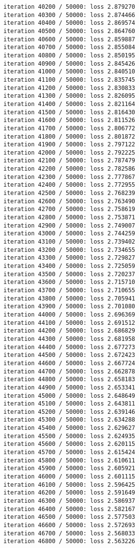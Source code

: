 \documentclass[11pt]{article}
\begin{document}
\begin{Verbatim}[commandchars=\\\{\}]
iteration 40200 / 50000: loss 2.879270
iteration 40300 / 50000: loss 2.874466
iteration 40400 / 50000: loss 2.869574
iteration 40500 / 50000: loss 2.864760
iteration 40600 / 50000: loss 2.859887
iteration 40700 / 50000: loss 2.855084
iteration 40800 / 50000: loss 2.850195
iteration 40900 / 50000: loss 2.845426
iteration 41000 / 50000: loss 2.840510
iteration 41100 / 50000: loss 2.835745
iteration 41200 / 50000: loss 2.830833
iteration 41300 / 50000: loss 2.826095
iteration 41400 / 50000: loss 2.821164
iteration 41500 / 50000: loss 2.816430
iteration 41600 / 50000: loss 2.811526
iteration 41700 / 50000: loss 2.806772
iteration 41800 / 50000: loss 2.801872
iteration 41900 / 50000: loss 2.797122
iteration 42000 / 50000: loss 2.792225
iteration 42100 / 50000: loss 2.787479
iteration 42200 / 50000: loss 2.782586
iteration 42300 / 50000: loss 2.777867
iteration 42400 / 50000: loss 2.772955
iteration 42500 / 50000: loss 2.768239
iteration 42600 / 50000: loss 2.763490
iteration 42700 / 50000: loss 2.758619
iteration 42800 / 50000: loss 2.753871
iteration 42900 / 50000: loss 2.749007
iteration 43000 / 50000: loss 2.744259
iteration 43100 / 50000: loss 2.739402
iteration 43200 / 50000: loss 2.734655
iteration 43300 / 50000: loss 2.729827
iteration 43400 / 50000: loss 2.725059
iteration 43500 / 50000: loss 2.720237
iteration 43600 / 50000: loss 2.715710
iteration 43700 / 50000: loss 2.710655
iteration 43800 / 50000: loss 2.705941
iteration 43900 / 50000: loss 2.701080
iteration 44000 / 50000: loss 2.696369
iteration 44100 / 50000: loss 2.691512
iteration 44200 / 50000: loss 2.686829
iteration 44300 / 50000: loss 2.681958
iteration 44400 / 50000: loss 2.677273
iteration 44500 / 50000: loss 2.672423
iteration 44600 / 50000: loss 2.667724
iteration 44700 / 50000: loss 2.662878
iteration 44800 / 50000: loss 2.658183
iteration 44900 / 50000: loss 2.653341
iteration 45000 / 50000: loss 2.648649
iteration 45100 / 50000: loss 2.643811
iteration 45200 / 50000: loss 2.639146
iteration 45300 / 50000: loss 2.634288
iteration 45400 / 50000: loss 2.629627
iteration 45500 / 50000: loss 2.624935
iteration 45600 / 50000: loss 2.620115
iteration 45700 / 50000: loss 2.615424
iteration 45800 / 50000: loss 2.610611
iteration 45900 / 50000: loss 2.605921
iteration 46000 / 50000: loss 2.601115
iteration 46100 / 50000: loss 2.596425
iteration 46200 / 50000: loss 2.591649
iteration 46300 / 50000: loss 2.586937
iteration 46400 / 50000: loss 2.582167
iteration 46500 / 50000: loss 2.577503
iteration 46600 / 50000: loss 2.572693
iteration 46700 / 50000: loss 2.568033
iteration 46800 / 50000: loss 2.563226

\end{Verbatim}
\end{document}
